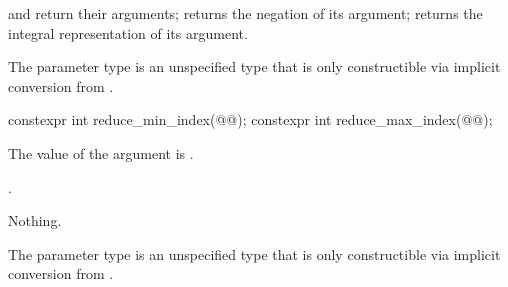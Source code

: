\begin{itemdescr}
  \pnum\returns
   and  return their arguments;  returns the negation of its argument;  returns the integral representation of its argument.

  \pnum\remarks
  The parameter type  is an unspecified type that is only constructible via implicit conversion from .
\end{itemdescr}

\begin{itemdecl}
constexpr int reduce_min_index(@@);
constexpr int reduce_max_index(@@);
\end{itemdecl}

\begin{itemdescr}
  \pnum\expects
  The value of the argument is .

  \pnum\returns
  .

  \pnum\throws Nothing.

  \pnum\remarks
  The parameter type  is an unspecified type that is only constructible via implicit conversion from .
\end{itemdescr}

